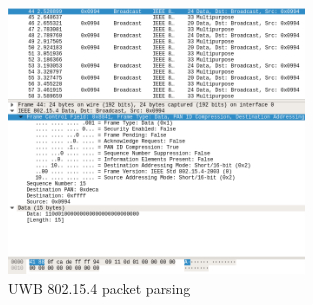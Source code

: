 \documentclass[\main/main.tex]{subfiles}
\begin{document}
\begin{figure}[H]
    \begin{center}
        \includegraphics[width=0.7\textwidth]{wireshark_802_15_5_packet.png}
    \end{center}
    \caption{UWB 802.15.4 packet parsing}
    \label{fig:wireshark_802_15_5_packet}
\end{figure}

\bib
\end{document}

